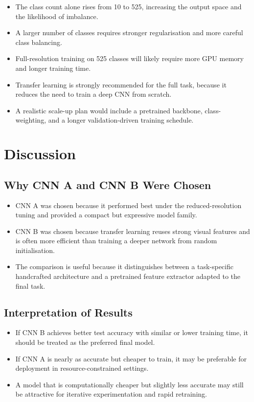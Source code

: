 \documentclass[11pt, a4paper]{report}
\begin{document}
\begin{itemize}[leftmargin=1.5em]
    \item The class count alone rises from 10 to 525, increasing the output space and the likelihood of imbalance.
    \item A larger number of classes requires stronger regularisation and more careful class balancing.
    \item Full-resolution training on 525 classes will likely require more GPU memory and longer training time.
    \item Transfer learning is strongly recommended for the full task, because it reduces the need to train a deep CNN from scratch.
    \item A realistic scale-up plan would include a pretrained backbone, class-weighting, and a longer validation-driven training schedule.
\end{itemize}

\chapter{Discussion}
\section{Why CNN A and CNN B Were Chosen}
\begin{itemize}[leftmargin=1.5em]
    \item CNN A was chosen because it performed best under the reduced-resolution tuning and provided a compact but expressive model family.
    \item CNN B was chosen because transfer learning reuses strong visual features and is often more efficient than training a deeper network from random initialisation.
    \item The comparison is useful because it distinguishes between a task-specific handcrafted architecture and a pretrained feature extractor adapted to the final task.
\end{itemize}

\section{Interpretation of Results}
\begin{itemize}[leftmargin=1.5em]
    \item If CNN B achieves better test accuracy with similar or lower training time, it should be treated as the preferred final model.
    \item If CNN A is nearly as accurate but cheaper to train, it may be preferable for deployment in resource-constrained settings.
    \item A model that is computationally cheaper but slightly less accurate may still be attractive for iterative experimentation and rapid retraining.
\end{itemize}
\end{document}
